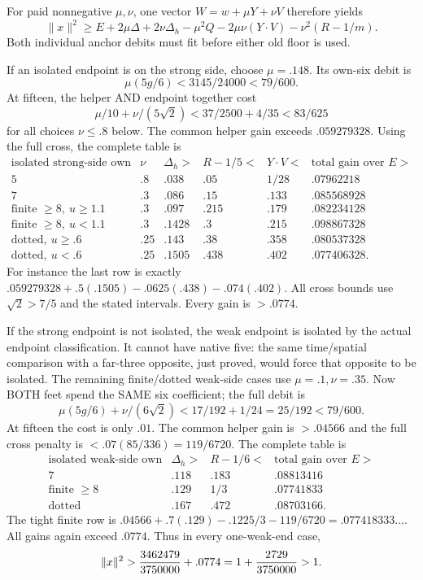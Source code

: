 For paid nonnegative \(\mu,\nu\),
one vector \(W=w+\mu Y+\nu V\)
therefore yields
\[
 \|x\|^2\ge E+2\mu\Delta+2\nu\Delta_h
           -\mu^2Q-2\mu\nu(Y\cdot V)-\nu^2(R-1/m).
\tag{A19joint}\label{app:exact19:eq:Ajoint}
\]
Both individual anchor debits must
fit before either old floor is used.

If an isolated endpoint is on the
strong side, choose \(\mu=.148\).
Its own-six debit is
\[
                       \mu(5g/6)<3145/24000<79/600 .
\]
At fifteen, the helper AND endpoint
together cost
\[
       \mu/10+\nu/(5\sqrt2)
              <37/2500+4/35<83/625
\]
for all choices \(\nu\le.8\) below.
The common helper gain exceeds
\(.059279328\).
Using the full cross, the complete
table is
\[
\begin{array}{c|c|c|c|c|c}
 \text{isolated strong-side own}&\nu&
 \Delta_h>&R-1/5<&Y\cdot V<&\text{total gain over }E>\\ \hline
 5&.8&.038&.05&1/28&.07962218\\
 7&.3&.086&.15&.133&.085568928\\
 \text{finite }\ge8,\ u\ge1.1&.3&.097&.215&.179&.082234128\\
 \text{finite }\ge8,\ u<1.1&.3&.1428&.3&.215&.098867328\\
 \text{dotted},\ u\ge.6&.25&.143&.38&.358&.080537328\\
 \text{dotted},\ u<.6&.25&.1505&.438&.402&.077406328 .
\end{array}
\]
For instance the last row is exactly
\(.059279328+.5(.1505)-.0625(.438)-.074(.402)\).
All cross bounds use \(\sqrt2>7/5\)
and the stated intervals.
Every gain is \(>.0774\).

If the strong endpoint is not
isolated, the weak endpoint is
isolated by the actual endpoint
classification.
It cannot have native five:
the same time/spatial comparison
with a far-three opposite, just
proved, would force that opposite
to be isolated.
The remaining finite/dotted
weak-side cases use
\(\mu=.1,\nu=.35\).
Now BOTH feet spend the SAME
six coefficient; the full debit is
\[
 \mu(5g/6)+\nu/(6\sqrt2)
                   <17/192+1/24=25/192<79/600 .
\]
At fifteen the cost is only \(.01\).
The common helper gain is \(>.04566\)
and the full cross penalty is
\(<.07(85/336)=119/6720\).
The complete table is
\[
\begin{array}{c|c|c|c}
 \text{isolated weak-side own}&\Delta_h>&R-1/6<&
                                    \text{total gain over }E>\\ \hline
 7&.118&.183&.08813416\\
 \text{finite }\ge8&.129&1/3&.07741833\\
 \text{dotted}&.167&.472&.08703166 .
\end{array}
\]
The tight finite row is
\(.04566+.7(.129)-.1225/3-119/6720
=.077418333\ldots\).
All gains again exceed \(.0774\).
Thus in every one-weak-end case,
\[
              \|x\|^2>{3462479\over3750000}+.0774
                       =1+{2729\over3750000}>1 .
\]

